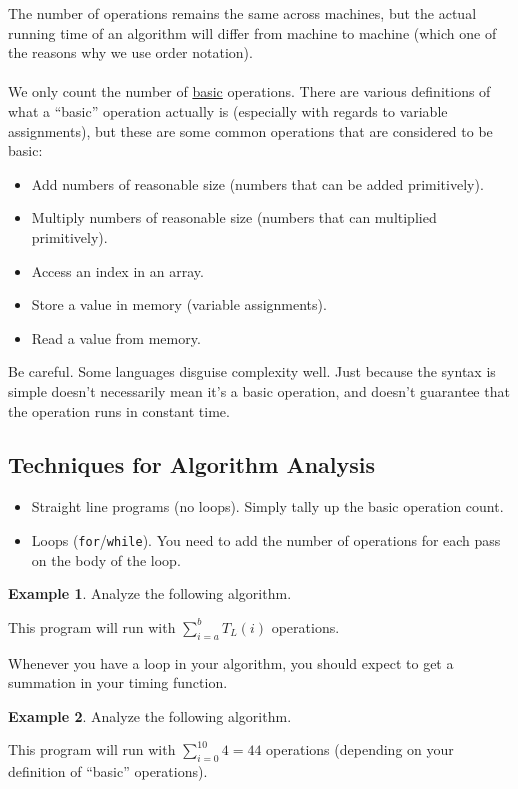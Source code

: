 \documentclass[]{article}
\theoremstyle{definition}
\newtheorem{ex}{Example}[section]
\begin{document}
		The number of operations remains the same across machines, but the actual running time of an algorithm will differ from machine to machine (which one of the reasons why we use order notation).
		\\ \\
		We only count the number of \underline{basic} operations. There are various definitions of what a ``basic'' operation actually is (especially with regards to variable assignments), but these are some common operations that are considered to be basic:
		\begin{itemize}
			\item Add numbers of reasonable size (numbers that can be added primitively).
			\item Multiply numbers of reasonable size (numbers that can multiplied primitively).
			\item Access an index in an array.
			\item Store a value in memory (variable assignments).
			\item Read a value from memory.	
		\end{itemize}
		Be careful. Some languages disguise complexity well. Just because the syntax is simple doesn't necessarily mean it's a basic operation, and doesn't guarantee that the operation runs in constant time.

		\subsection{Techniques for Algorithm Analysis}
			\begin{itemize}
				\item Straight line programs (no loops). Simply tally up the basic operation count.
				\item Loops (\verb+for+/\verb+while+). You need to add the number of operations for each pass on the body of the loop.
			\end{itemize}

			\begin{ex}
				Analyze the following algorithm. \\
				\begin{algorithm}[H]
				\end{algorithm}
				This program will run with $\sum_{i = a}^{b} T_L(i)$ operations.
			\end{ex}

			Whenever you have a loop in your algorithm, you should expect to get a summation in your timing function.
			\begin{ex}
				Analyze the following algorithm. \\
				\begin{algorithm}[H]
				\end{algorithm}

				This program will run with $\sum_{i = 0}^{10} 4 = 44$ operations (depending on your definition of ``basic'' operations).
			\end{ex}
\end{document}
